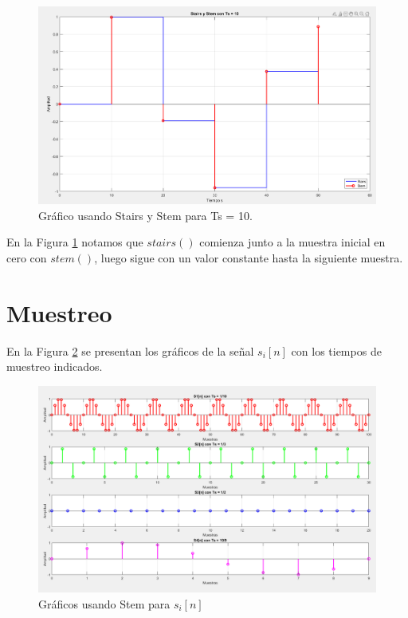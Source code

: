 \documentclass[letterpaper,onecolumn,10pt,journal,final]{IEEEtran}
\begin{document}
\begin{enumerate}[{1)}]
    \begin{figure}[H]
    \centering
    \includegraphics[scale=0.4]{Figuras/plotI6.png}
    \caption{Gráfico usando Stairs y Stem para Ts = 10.}\label{I6}
    \end{figure}
    
    En la Figura \ref{I6} notamos que $stairs()$ comienza junto a la muestra inicial en cero con $stem()$, luego sigue con un valor constante hasta la siguiente muestra.
    
    
\end{enumerate}

%
%
\section{Muestreo}

En la Figura \ref{II1} se presentan los gráficos de la señal $s_i[n]$ con los tiempos de muestreo indicados.

\begin{figure}[H]
    \centering
    \includegraphics[scale=0.5]{Figuras/plotII1.png}
    \caption{Gráficos usando Stem para $s_i [n]$}\label{II1}
\end{figure}
\end{document}
